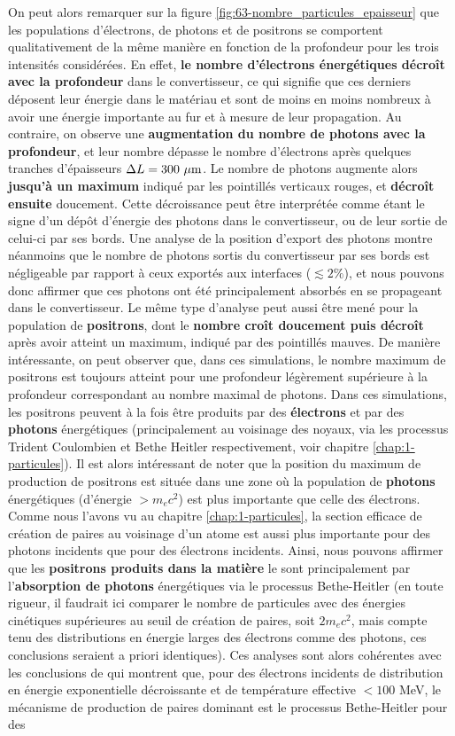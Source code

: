 \begin{refsection}
On peut alors remarquer sur la figure \ref{fig:63-nombre_particules_epaisseur} que les populations d'électrons, de photons et de positrons se comportent qualitativement de la même manière en fonction de la profondeur pour les trois intensités considérées. En effet, \textbf{le nombre d'électrons énergétiques décroît avec la profondeur} dans le convertisseur, ce qui signifie que ces derniers déposent leur énergie dans le matériau et sont de moins en moins nombreux à avoir une énergie importante au fur et à mesure de leur propagation. Au contraire, on observe une \textbf{augmentation du nombre de photons avec la profondeur}, et leur nombre dépasse le nombre d'électrons après quelques tranches d'épaisseurs $\Delta L=300 ~ \rm \mu m$. Le nombre de photons augmente alors \textbf{jusqu'à un maximum} indiqué par les pointillés verticaux rouges, et \textbf{décroît ensuite} doucement. Cette décroissance peut être interprétée comme étant le signe d'un dépôt d'énergie des photons dans le convertisseur, ou de leur sortie de celui-ci par ses bords. Une analyse de la position d'export des photons montre néanmoins que le nombre de photons sortis du convertisseur par ses bords est négligeable par rapport à ceux exportés aux interfaces ($\lesssim 2 \%$), et nous pouvons donc affirmer que ces photons ont été principalement absorbés en se propageant dans le convertisseur. Le même type d'analyse peut aussi être mené pour la population de \textbf{positrons}, dont le \textbf{nombre croît doucement puis décroît} après avoir atteint un maximum, indiqué par des pointillés mauves. De manière intéressante, on peut observer que, dans ces simulations, le nombre maximum de positrons est toujours atteint pour une profondeur légèrement supérieure à la profondeur correspondant au nombre maximal de photons. Dans ces simulations, les positrons peuvent à la fois être produits par des \textbf{électrons} et par des \textbf{photons} énergétiques (principalement au voisinage des noyaux, via les processus Trident Coulombien et Bethe Heitler respectivement, voir chapitre \ref{chap:1-particules}). Il est alors intéressant de noter que la position du maximum de production de positrons est située dans une zone où la population de \textbf{photons} énergétiques (d'énergie $>m_e c^2$) est plus importante que celle des électrons. Comme nous l'avons vu au chapitre \ref{chap:1-particules}, la section efficace de création de paires au voisinage d'un atome est aussi plus importante pour des photons incidents que pour des électrons incidents. Ainsi, nous pouvons affirmer que les \textbf{positrons produits dans la matière} le sont principalement par l'\textbf{absorption de photons} énergétiques via le processus Bethe-Heitler (en toute rigueur, il faudrait ici comparer le nombre de particules avec des énergies cinétiques supérieures au seuil de création de paires, soit $2 m_e c^2$, mais compte tenu des distributions en énergie larges des électrons comme des photons, ces conclusions seraient a priori identiques). Ces analyses sont alors cohérentes avec les conclusions de \cite{myatt_2009a} qui montrent que, pour des électrons incidents de distribution en énergie exponentielle décroissante et de température effective $<100$ MeV, le mécanisme de production de paires dominant est le processus Bethe-Heitler pour des 
\end{refsection}
